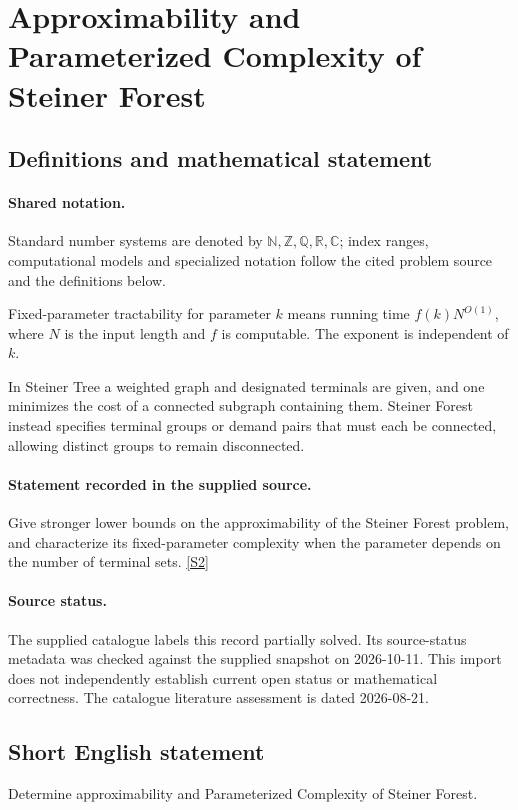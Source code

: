 \documentclass[11pt]{article}
\newcommand{\sref}[2]{\hyperlink{source:#1:#2}{[S#2]}}
\begin{document}
\section{Approximability and Parameterized Complexity of Steiner Forest}\label{statement}

\subsection{Definitions and mathematical statement}

\paragraph{Shared notation.}Standard number systems are denoted by $\mathbb N,\mathbb Z,\mathbb Q,\mathbb R,\mathbb C$; index ranges, computational models and specialized notation follow the cited problem source and the definitions below.


Fixed-parameter tractability for parameter $k$ means running time $f(k)N^{O(1)}$, where $N$ is the input length and $f$ is computable. The exponent is independent of $k$.

In Steiner Tree a weighted graph and designated terminals are given, and one minimizes the cost of a connected subgraph containing them. Steiner Forest instead specifies terminal groups or demand pairs that must each be connected, allowing distinct groups to remain disconnected.
\paragraph{Statement recorded in the supplied source.}
Give stronger lower bounds on the approximability of the Steiner Forest problem, and characterize its fixed-parameter complexity when the parameter depends on the number of terminal sets. \sref{statement}{2}
\paragraph{Source status.}
The supplied catalogue labels this record partially solved. Its source-status metadata was checked against the supplied snapshot on 2026-10-11. This import does not independently establish current open status or mathematical correctness. The catalogue literature assessment is dated 2026-08-21.
\subsection{Short English statement}
Determine approximability and Parameterized Complexity of Steiner Forest.
\end{document}
